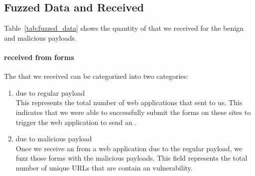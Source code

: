 \subsection{Fuzzed Data and Received \Emails}
Table~\ref{tab:fuzzed_data} shows the quantity of \emails that we received for the benign and malicious payloads. 

\paragraph{\Email received from forms}
The \emails that we received can be categorized into two categories:
\begin{enumerate}
	\item \Emails due to regular payload\\
	This represents the total number of web applications that sent \emails to us. This indicates that we were able to successfully submit the forms on these sites to trigger the web application to send an \email.
	
	\item \Emails due to malicious payload\\
    Once we receive an \email from a web application due to the regular payload, we fuzz those forms with the malicious payloads. This field represents the total number of unique URLs that are  contain an \ehi vulnerability.
\end{enumerate}



